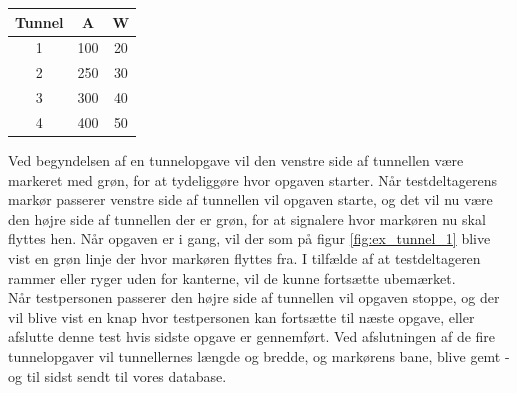 \begin{center}
	\begin{tabular}{c c c}
		Tunnel & A & W \\
		\hline
		1 & 100 & 20 \\
		2 & 250 & 30 \\
		3 & 300 & 40 \\
		4 & 400 & 50 \\
	\end{tabular}
	\label{tab:tunnelopgave}
\end{center}
Ved begyndelsen af en tunnelopgave vil den venstre side af tunnellen være markeret med grøn, for at tydeliggøre hvor opgaven starter. Når testdeltagerens markør passerer venstre side af tunnellen vil opgaven starte, og det vil nu være den højre side af tunnellen der er grøn, for at signalere hvor markøren nu skal flyttes hen. Når opgaven er i gang, vil der som på figur \ref{fig:ex_tunnel_1} blive vist en grøn linje der hvor markøren flyttes fra. I tilfælde af at testdeltageren rammer eller ryger uden for kanterne, vil de kunne fortsætte ubemærket.\\
Når testpersonen passerer den højre side af tunnellen vil opgaven stoppe, og der vil blive vist en knap hvor testpersonen kan fortsætte til næste opgave, eller afslutte denne test hvis sidste opgave er gennemført. Ved afslutningen af de fire tunnelopgaver vil tunnellernes længde og bredde, og markørens bane, blive gemt - og til sidst sendt til vores database.

